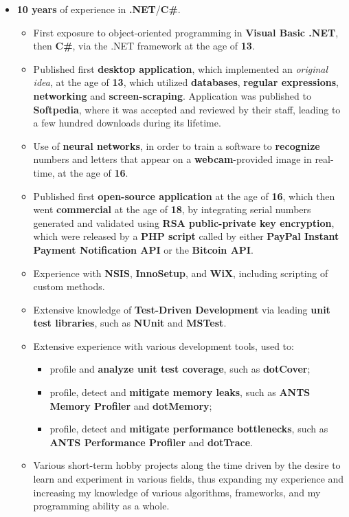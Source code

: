 \documentclass[11pt,a4paper,sans]{moderncv}
\begin{document}
	\begin{itemize}
	\item	\label{softdevcs}  \textbf{10 years} of experience in \textbf{.NET}/\textbf{C\#}.
		\begin{itemize}
		\item	First exposure to object-oriented programming in \textbf{Visual Basic .NET}, then \textbf{C\#}, via the .NET framework at the age of \textbf{13}.
		\item	Published first \textbf{desktop application}, which implemented an \textit{original idea}, at the age of \textbf{13}, which utilized \textbf{databases}, \textbf{regular expressions}, \textbf{networking} and \textbf{screen-scraping}. Application was published to \textbf{Softpedia}, where it was accepted and reviewed by their staff, leading to a few hundred downloads during its lifetime. 
		\item	Use of \textbf{neural networks}, in order to train a software to \textbf{recognize} numbers and letters that appear on a \textbf{webcam}-provided image in real-time, at the age of \textbf{16}.
		\item	Published first \textbf{open-source application} at the age of \textbf{16}, which then went \textbf{commercial} at the age of \textbf{18}, by integrating serial numbers generated and validated using \textbf{RSA public-private key encryption}, which were released by a \textbf{PHP script} called by either \textbf{PayPal Instant Payment Notification API} or the \textbf{Bitcoin API}.
		\item	Experience with \textbf{NSIS}, \textbf{InnoSetup}, and \textbf{WiX}, including scripting of custom methods.
		\item	Extensive knowledge of \textbf{Test-Driven Development} via leading \textbf{unit test libraries}, such as \textbf{NUnit} and \textbf{MSTest}.
		\item	Extensive experience with various development tools, used to:
			\begin{itemize}
			\item	profile and \textbf{analyze unit test coverage}, such as \textbf{dotCover};
			\item	profile, detect and \textbf{mitigate memory leaks}, such as \textbf{ANTS Memory Profiler} and \textbf{dotMemory};
			\item	profile, detect and \textbf{mitigate performance bottlenecks}, such as \textbf{ANTS Performance Profiler} and \textbf{dotTrace}.
			\end{itemize}
		\item	Various short-term hobby projects along the time driven by the desire to learn and experiment in various fields, thus expanding my experience and increasing my knowledge of various algorithms, frameworks, and my programming ability as a whole.
		\end{itemize}
	\end{itemize}
\end{document}
